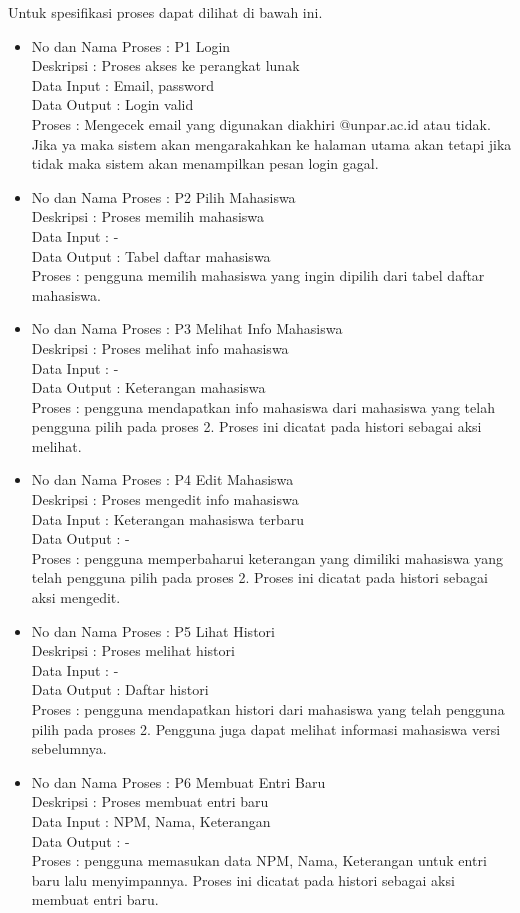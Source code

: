 \begin{enumerate}[(1)]
Untuk spesifikasi proses dapat dilihat di bawah ini.
\begin{itemize}
  \item No dan Nama Proses : P1 Login\\
  Deskripsi : Proses akses ke perangkat lunak\\
  Data Input : Email, password\\
  Data Output : Login valid\\
  Proses : Mengecek email yang digunakan diakhiri @unpar.ac.id atau tidak. Jika
  ya maka sistem akan mengarakahkan ke halaman utama akan tetapi jika tidak maka
  sistem akan menampilkan pesan login gagal.
  \item No dan Nama Proses : P2 Pilih Mahasiswa\\
  Deskripsi : Proses memilih mahasiswa\\
  Data Input : -\\
  Data Output : Tabel daftar mahasiswa\\
  Proses : pengguna memilih mahasiswa yang ingin dipilih dari tabel daftar
  mahasiswa.
  \item No dan Nama Proses : P3 Melihat Info Mahasiswa\\
  Deskripsi : Proses melihat info mahasiswa\\
  Data Input : -\\
  Data Output : Keterangan mahasiswa\\
  Proses : pengguna mendapatkan info mahasiswa dari mahasiswa yang telah
  pengguna pilih pada proses 2. Proses ini dicatat pada histori sebagai aksi
  melihat.
  \item No dan Nama Proses : P4 Edit Mahasiswa\\
  Deskripsi : Proses mengedit info mahasiswa\\
  Data Input : Keterangan mahasiswa terbaru\\
  Data Output : -\\
  Proses : pengguna memperbaharui keterangan yang dimiliki mahasiswa yang telah
  pengguna pilih pada proses 2. Proses ini dicatat pada histori sebagai aksi
  mengedit.
  \item No dan Nama Proses : P5 Lihat Histori\\
  Deskripsi : Proses melihat histori\\
  Data Input : -\\
  Data Output : Daftar histori\\
  Proses : pengguna mendapatkan histori dari mahasiswa yang telah pengguna
  pilih pada proses 2. Pengguna juga dapat melihat informasi mahasiswa versi
  sebelumnya.
  \item No dan Nama Proses : P6 Membuat Entri Baru\\
  Deskripsi : Proses membuat entri baru\\
  Data Input : NPM, Nama, Keterangan\\
  Data Output : -\\
  Proses : pengguna memasukan data NPM, Nama, Keterangan untuk entri baru lalu
  menyimpannya. Proses ini dicatat pada histori sebagai aksi membuat entri baru.
\end{itemize}  
\end{enumerate}